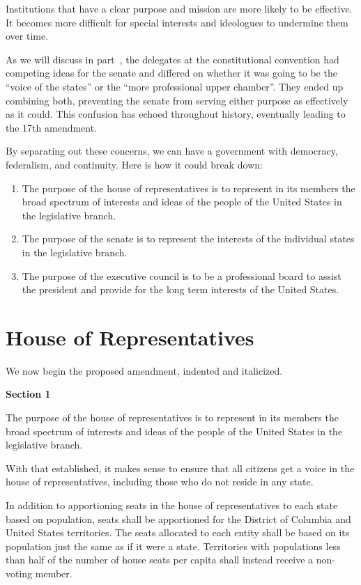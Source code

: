 \documentclass{article}
\begin{document}
Institutions that have a clear purpose and mission are more likely to be effective. It becomes more difficult for special interests and ideologues to undermine them over time.

As we will discuss in part~\label{section:Senate}, the delegates at the constitutional convention had competing ideas for the senate and differed on whether it was going to be the “voice of the states” or the “more professional upper chamber”. They ended up combining both, preventing the senate from serving either purpose as effectively as it could. This confusion has echoed throughout history, eventually leading to the 17th amendment.

By separating out these concerns, we can have a government with democracy, federalism, and continuity. Here is how it could break down:
\begin{enumerate}[I]
\item The purpose of the house of representatives is to represent in its members the broad spectrum of interests and ideas of the people of the United States in the legislative branch.
\item The purpose of the senate is to represent the interests of the individual states in the legislative branch.
\item The purpose of the executive council is to be a professional board to assist the president and provide for the long term interests of the United States.
\end{enumerate}

\section{House of Representatives}

We now begin the proposed amendment, indented and italicized.

\begin{quoting}
\textbf{Section 1}

The purpose of the house of representatives is to represent in its members the broad spectrum of interests and ideas of the people of the United States in the legislative branch.
\end{quoting}

With that established, it makes sense to ensure that all citizens get a voice in the house of representatives, including those who do not reside in any state.

\begin{quoting}
In addition to apportioning seats in the house of representatives to each state based on population, seats shall be apportioned for the District of Columbia and United States territories. The seats allocated to each entity shall be based on its population just the same as if it were a state. Territories with populations less than half of the number of house seats per capita shall instead receive a non-voting member.
\end{quoting}
\end{document}
